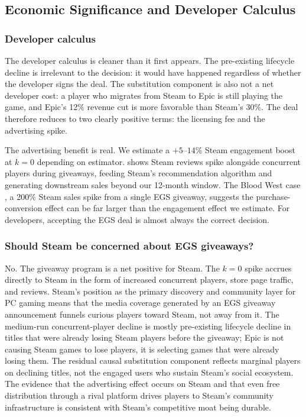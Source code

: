 \documentclass[11pt]{article}
\begin{document}
\subsection{Economic Significance and Developer Calculus}

\subsubsection*{Developer calculus}

The developer calculus is cleaner than it first appears. The pre-existing
lifecycle decline is irrelevant to the decision: it would have happened
regardless of whether the developer signs the deal. The substitution
component is also not a net developer cost: a player who migrates from
Steam to Epic is still playing the game, and Epic's 12\% revenue cut is
more favorable than Steam's 30\%. The deal therefore reduces to two
clearly positive terms: the licensing fee and the advertising spike.

The advertising benefit is real. We estimate a $+5$--$14\%$ Steam
engagement boost at $k = 0$ depending on estimator. \citet{clarkson2025}
shows Steam reviews spike alongside concurrent players during giveaways,
feeding Steam's recommendation algorithm and generating downstream sales
beyond our 12-month window. The Blood West case \citep{frvr2026}, a
200\% Steam sales spike from a single EGS giveaway, suggests the
purchase-conversion effect can be far larger than the engagement effect
we estimate. For developers, accepting the EGS deal is almost always
the correct decision.

\subsubsection*{Should Steam be concerned about EGS giveaways?}

No. The giveaway program is a net positive for Steam. The $k = 0$ spike
accrues directly to Steam in the form of increased concurrent players,
store page traffic, and reviews. Steam's position as the primary discovery
and community layer for PC gaming means that the media coverage generated
by an EGS giveaway announcement funnels curious players toward Steam, not
away from it. The medium-run concurrent-player decline is mostly pre-existing
lifecycle decline in titles that were already losing Steam players before
the giveaway; Epic is not causing Steam games to lose players, it is
selecting games that were already losing them. The residual causal
substitution component reflects marginal players on declining titles, not
the engaged users who sustain Steam's social ecosystem. The evidence that
the advertising effect occurs on Steam and that even free distribution
through a rival platform drives players to Steam's community infrastructure
is consistent with Steam's competitive moat being durable.
\end{document}
